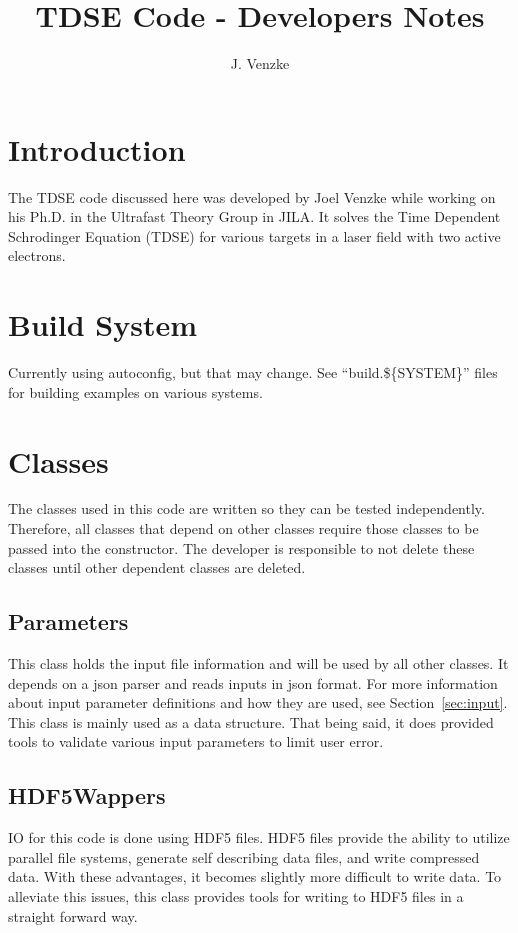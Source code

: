 \documentclass{article}
\title{TDSE Code - Developers Notes}
\author{J. Venzke}
\begin{document}
\maketitle
\section{Introduction} %
\label{sec:introduction}
The TDSE code discussed here was developed by Joel Venzke while working on his Ph.D. in the Ultrafast Theory Group in JILA. It solves the Time Dependent Schrodinger Equation (TDSE) for various targets in a laser field with two active electrons.

\section{Build System} %
\label{sec:build_system}
Currently using autoconfig, but that may change. See ``build.\$\{SYSTEM\}'' files for building examples on various systems.

\section{Classes} %
\label{sec:classes}

The classes used in this code are written so they can be tested independently. Therefore, all classes that depend on other classes require those classes to be passed into the constructor. The developer is responsible to not delete these classes until other dependent classes are deleted.

\subsection{Parameters} %
\label{sub:parameters}
This class holds the input file information and will be used by all other classes. It depends on a json parser and reads inputs in json format. For more information about input parameter definitions and how they are used, see Section~\ref{sec:input}. This class is mainly used as a data structure. That being said, it does provided tools to validate various input parameters to limit user error.


\subsection{HDF5Wappers} %
\label{sub:hdf5wappers}
IO for this code is done using HDF5 files. HDF5 files provide the ability to utilize parallel file systems, generate self describing data files, and write compressed data. With these advantages, it becomes slightly more difficult to write data. To alleviate this issues, this class provides tools for writing to HDF5 files in a straight forward way.
\end{document}
